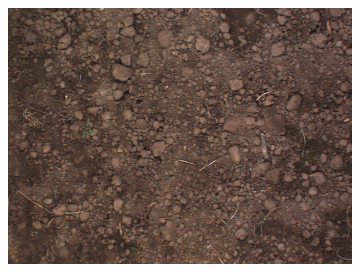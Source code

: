 \documentclass[letterpaper, 10 pt, conference]{ieeeconf}  %
\begin{document}
\begin{figure}
\begin{subfigure}[b]{0.31\linewidth}
    \includegraphics[width=\linewidth]{pics/zurich/images/bonirob_2016-10-13-09-03-00_0_frame66.png}
   		\caption{}
		\label{zurich_img}    		
   \end{subfigure}
   
   
   

\end{figure}
\end{document}
